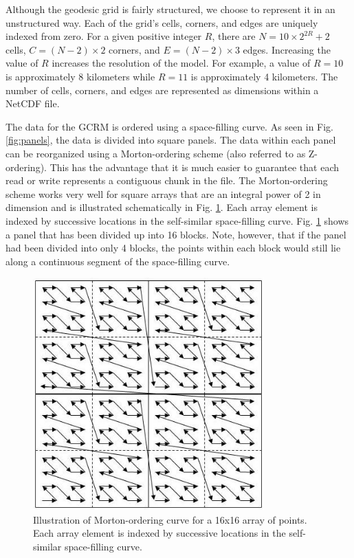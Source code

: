Although the geodesic grid is fairly structured, we choose to represent it in
an unstructured way.  Each of the grid's cells, corners, and edges are
uniquely indexed from zero.  For a given positive integer $R$, there are $N =
10 \times 2^{2R} + 2$ cells, $C = (N-2) \times 2$ corners, and $E = (N-2)
\times 3$ edges.  Increasing the value of $R$ increases the resolution of the
model.  For example, a value of $R=10$ is approximately 8 kilometers while
$R=11$ is approximately 4 kilometers.  The number of cells, corners, and edges
are represented as dimensions within a NetCDF file.

The data for the GCRM is ordered using a space-filling curve.  As seen in Fig.
\ref{fig:panels}, the data is divided into square panels.  The data within
each panel can be reorganized using a Morton-ordering scheme (also referred to
as Z-ordering).  This has the advantage that it is much easier to guarantee
that each read or write represents a contiguous chunk in the file.  The
Morton-ordering scheme works very well for square arrays that are an integral
power of 2 in dimension and is illustrated schematically in Fig.
\ref{fig:morton}.  Each array element is indexed by successive locations in
the self-similar space-filling curve.  Fig. \ref{fig:morton} shows a panel
that has been divided up into 16 blocks.  Note, however, that if the panel had
been divided into only 4 blocks, the points within each block would still lie
along a continuous segment of the space-filling curve.

\begin{figure}[!t]
\center
\includegraphics[width=3.5in]{images/morton}
\caption{Illustration of Morton-ordering curve for a 16x16 array of points.
Each array element is indexed by successive locations in the self-similar
space-filling curve.}
\label{fig:morton}
\end{figure}

